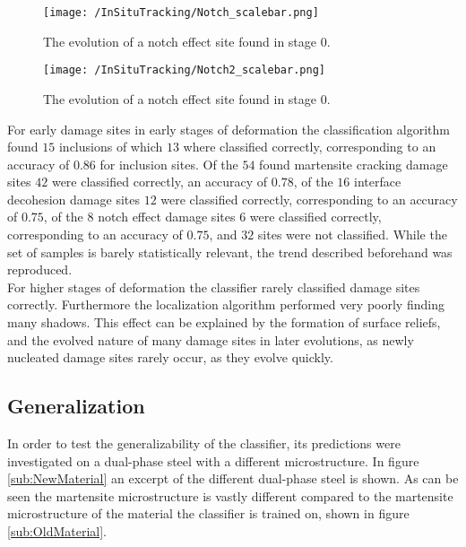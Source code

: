 
\begin{figure}
\texttt{[image: /InSituTracking/Notch\_scalebar.png]}
\caption{The evolution of a notch effect site found in stage 0.}
\label{fig:NEEV1}
\end{figure}

\begin{figure}
\texttt{[image: /InSituTracking/Notch2\_scalebar.png]}
\caption{The evolution of a notch effect site found in stage 0.}
\label{fig:NEEV2}
\end{figure}



For early damage sites in early stages of deformation the classification algorithm found $15$ inclusions of which $13$ where classified correctly, corresponding to an accuracy of $0.86$ for inclusion sites. Of the $54$ found martensite cracking damage sites $42$ were classified correctly, an accuracy of $0.78$, of the $16$ interface decohesion damage sites $12$ were classified correctly, corresponding to an accuracy of $0.75$, of the $8$ notch effect damage sites $6$ were classified correctly, corresponding to an accuracy of $0.75$, and $32$ sites were not classified. While the set of samples is barely statistically relevant, the trend described beforehand was reproduced. \\

For higher stages of deformation the classifier rarely classified damage sites correctly. Furthermore the localization algorithm performed very poorly finding many shadows. This effect can be explained by the formation of surface reliefs, and the evolved nature of many damage sites in later evolutions, as newly nucleated damage sites rarely occur, as they evolve quickly. 

\subsection{Generalization}
\label{sec:Generalization}

In order to test the generalizability of the classifier, its predictions were investigated on a dual-phase steel with a different microstructure. In figure \ref{sub:NewMaterial} an excerpt of the different dual-phase steel is shown. As can be seen the martensite microstructure is vastly different compared to the martensite microstructure of the material the classifier is trained on, shown in figure \ref{sub:OldMaterial}. \\

